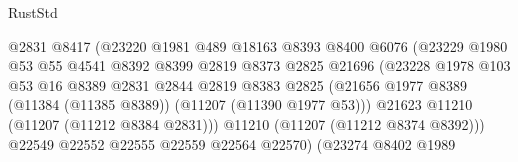 \begin{lexlean}{RustStd}
\begin{coremodule}
                                        @2831
                                        @8417
                                        (@23220
                                          @1981
                                          @489
                                          @18163
                                          @8393
                                          @8400
                                          @6076
                                          (@23229
                                            @1980
                                            @53
                                            @55
                                            @4541
                                            @8392
                                            @8399
                                            @2819
                                            @8373
                                            @2825
                                            @21696
                                            (@23228
                                              @1978
                                              @103
                                              @53
                                              @16
                                              @8389
                                              @2831
                                              @2844
                                              @2819
                                              @8383
                                              @2825
                                              (@21656
                                                @1977
                                                @8389
                                                (@11384 (@11385 @8389))
                                                (@11207 (@11390 @1977 @53)))
                                              @21623
                                              @11210
                                              (@11207 (@11212 @8384 @2831)))
                                            @11210
                                            (@11207 (@11212 @8374 @8392)))
                                          @22549
                                          @22552
                                          @22555
                                          @22559
                                          @22564
                                          @22570)
                                        (@23274
                                          @8402
                                          @1989

\end{coremodule}
\end{lexlean}
